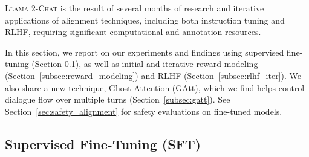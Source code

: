 \documentclass{article}
\newcommand{\modelname}{\textsc{Llama 2-Chat}\xspace}
\begin{document}
\modelname is the result of several months of research and iterative applications of alignment techniques, including both instruction tuning and RLHF, requiring significant computational and annotation resources.

In this section, we report on our experiments and findings using supervised fine-tuning (Section \ref{subsec:SFT}), as well as initial and iterative reward modeling (Section~\ref{subsec:reward_modeling}) and RLHF (Section~\ref{subsec:rlhf_iter}). We also share a new technique, Ghost Attention (GAtt), which we find helps control dialogue flow over multiple turns (Section~\ref{subsec:gatt}). See Section~\ref{sec:safety_alignment} for safety evaluations on fine-tuned models.

\subsection{Supervised Fine-Tuning (SFT)} 
\label{subsec:SFT}
\end{document}
